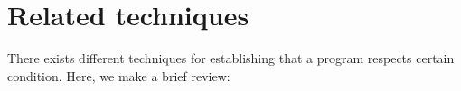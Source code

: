 \section{Related techniques}

There exists different techniques for establishing that a program respects certain condition. Here, we make a brief review:

